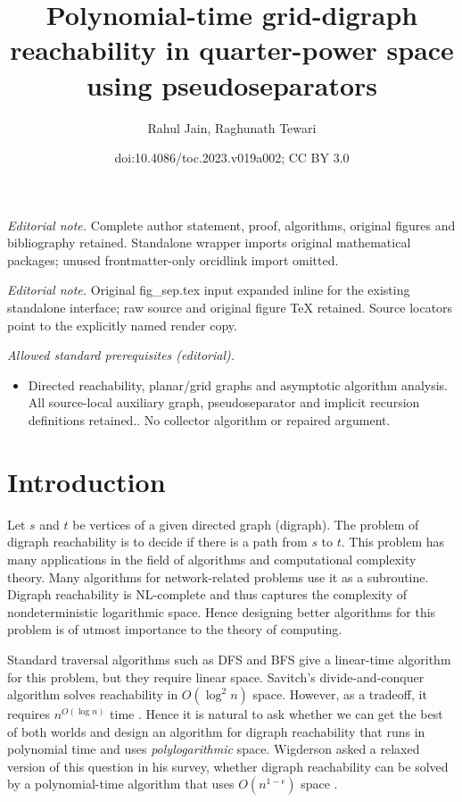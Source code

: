 \documentclass[11pt]{article}
\title{Polynomial-time grid-digraph reachability in quarter-power space using pseudoseparators}
\author{Rahul Jain, Raghunath Tewari}
\date{doi:10.4086/toc.2023.v019a002; CC BY 3.0}
\numberwithin{equation}{section}
\theoremstyle{definition}
\theoremstyle{plain}
\begin{document}
\maketitle
\noindent\textit{Editorial note.} Complete author statement, proof, algorithms, original figures and bibliography retained. Standalone wrapper imports original mathematical packages; unused frontmatter-only orcidlink import omitted.\par\medskip
\noindent\textit{Editorial note.} Original fig\_sep.tex input expanded inline for the existing standalone interface; raw source and original figure TeX retained. Source locators point to the explicitly named render copy.\par\medskip
\noindent\textit{Allowed standard prerequisites (editorial).}\begin{itemize}
\item Directed reachability, planar/grid graphs and asymptotic algorithm analysis. All source-local auxiliary graph, pseudoseparator and implicit recursion definitions retained.. No collector algorithm or repaired argument.
\end{itemize}\medskip
\section{Introduction}
%
%
%
%
%
%
%
%
%
%
%
Let $s$ and $t$ be vertices of a given 
%
directed graph (digraph). %
%
The problem of 
digraph %
reachability is to decide if there is a path from $s$ to $t$. This problem has %
%
many  %
applications in the field of algorithms and computational complexity theory. Many algorithms for network-related problems use it as a subroutine. 
%
Digraph reachability is \textsf{NL}-complete and thus
%
captures  %
the complexity of %
nondeterministic  %
logarithmic space. Hence designing better algorithms for this problem is of utmost importance
%
to the theory of computing.  %

Standard 
traversal algorithms such as DFS and BFS give a
%
linear-time   %
algorithm for this problem, but they require linear space. Savitch's 
divide-and-conquer 
%
algorithm %
solves  %
reachability in $O(\log^2 n)$ space. However, as a tradeoff, it requires $n^{O(\log n)}$ time \cite{Savitch}. Hence it is natural to ask whether we can get the best of both worlds and design an algorithm for 
digraph %
reachability that runs in polynomial time and uses \emph{polylogarithmic} space. Wigderson asked a relaxed version of this question in his survey, whether 
digraph %
reachability can be solved by a polynomial-time algorithm that uses $O(n^{1-\epsilon})$ space \cite{Wigderson}.
\end{document}
